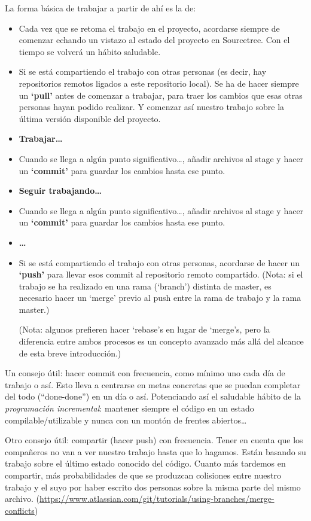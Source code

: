 \documentclass[spanish,12pt,a4paper,final,oneside]{book}
\begin{document}
La forma básica de trabajar a partir de ahí es la de:
\begin{itemize}
\item Cada vez que se retoma el trabajo en el proyecto, acordarse siempre de comenzar echando un vistazo al estado del proyecto en Sourcetree. Con el tiempo se volverá un hábito saludable.
\item Si se está compartiendo el trabajo con otras personas (es decir, hay repositorios remotos ligados a este repositorio local). Se ha de hacer siempre un \textbf{`pull'} antes de comenzar a trabajar, para traer los cambios que esas otras personas hayan podido realizar. Y comenzar así nuestro trabajo sobre la última versión disponible del proyecto.
\item \textbf{Trabajar\ldots}
\item Cuando se llega a algún punto significativo\ldots, añadir archivos al stage y hacer un \textbf{`commit'} para guardar los cambios hasta ese punto.
\item \textbf{Seguir trabajando\ldots}
\item Cuando se llega a algún punto significativo\ldots, añadir archivos al stage y  hacer un \textbf{`commit'} para guardar los cambios hasta ese punto.
\item \textbf{\ldots}
\item Si se está compartiendo el trabajo con otras personas, acordarse de hacer un \textbf{`push'} para llevar esos commit al repositorio remoto compartido. (Nota: si el trabajo se ha realizado en una rama (`branch') distinta de master, es necesario hacer un `merge' previo al push entre la rama de trabajo y la rama master.) \begin{footnotesize}(Nota: algunos prefieren hacer `rebase's en lugar de `merge's, pero la diferencia entre ambos procesos es un concepto avanzado más allá del alcance de esta breve introducción.)\end{footnotesize} 
\end{itemize}

Un consejo útil: hacer commit con frecuencia, como mínimo uno cada día de trabajo o así. Esto lleva a centrarse en metas concretas que se puedan completar del todo (``done-done'') en un día o así. Potenciando así el saludable hábito de la \textit{programación incremental}: mantener siempre el código en un estado compilable/utilizable y nunca con un montón de frentes abiertos\ldots

Otro consejo útil: compartir (hacer push) con frecuencia. Tener en cuenta que los compañeros no van a ver nuestro trabajo hasta que lo hagamos. Están basando su trabajo sobre el último estado conocido del código. Cuanto más tardemos en compartir, más probabilidades de que se produzcan colisiones entre nuestro trabajo y el suyo por haber escrito dos personas sobre la misma parte del mismo archivo. (\url{https://www.atlassian.com/git/tutorials/using-branches/merge-conflicts})
\end{document}

